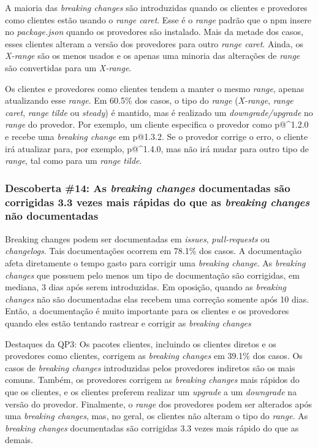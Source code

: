 A maioria das \textit{breaking changes} são introduzidas quando os clientes e provedores como clientes estão usando o \textit{range caret}. Esse é o \textit{range} padrão que o \textsf{npm} insere no \textit{package.json} quando os provedores são instalado. Mais da metade dos casos, esses clientes alteram a versão dos provedores para outro \textit{range caret}. Ainda, os \textit{X-range} são os menos usados e os apenas uma minoria das alterações de \textit{range} são convertidas para um \textit{X-range}.

Os clientes e provedores como clientes tendem a manter o mesmo \textit{range}, apenas atualizando esse \textit{range}. Em 60.5\% dos casos, o tipo do \textit{range} (\textit{X-range}, \textit{range caret}, \textit{range tilde} ou \textit{steady}) é mantido, mas é realizado um \textit{downgrade/upgrade} no \textit{range} do provedor. Por exemplo, um cliente especifica o provedor como \textsf{p@\textasciicircum1.2.0} e recebe uma \textit{breaking change} em \textsf{p@1.3.2}. Se o provedor corrige o erro, o cliente irá atualizar para, por exemplo, \textsf{p@\textasciicircum1.4.0}, mas não irá mudar para outro tipo de \textit{range}, tal como para um \textit{range tilde}.

\subsubsection{Descoberta \#14: As \textit{breaking changes} documentadas são corrigidas 3.3 vezes mais rápidas do que as \textit{breaking changes} não documentadas}

Breaking changes podem ser documentadas em \textit{issues}, \textit{pull-requests} ou \textit{changelogs}. Tais documentações ocorrem em 78.1\% dos casos. A documentação afeta diretamente o tempo gasto para corrigir uma \textit{breaking change}. As \textit{breaking changes} que possuem pelo menos um tipo de documentação são corrigidas, em mediana, 3 dias após serem introduzidas. Em oposição, quando as \textit{breaking changes} não são documentadas elas recebem uma correção somente após 10 dias. Então, a documentação é muito importante para os clientes e os provedores quando eles estão tentando rastrear e corrigir as \textit{breaking changes}

\begin{mdframed}
Destaques da QP3: Os pacotes clientes, incluindo os clientes diretos e os provedores como clientes, corrigem as \textit{breaking changes} em 39.1\% dos casos. Os casos de \textit{breaking changes} introduzidas pelos provedores indiretos são os mais comuns. Também, os provedores corrigem as \textit{breaking changes} mais rápidos do que os clientes, e os clientes preferem realizar um \textit{upgrade} a um \textit{downgrade} na versão do provedor. Finalmente, o \textit{range} dos provedores podem ser alterados após uma \textit{breaking changes}, mas, no geral, os clientes não alteram o tipo do \textit{range}. As \textit{breaking changes} documentadas são corrigidas 3.3 vezes mais rápido do que as demais.
\end{mdframed}